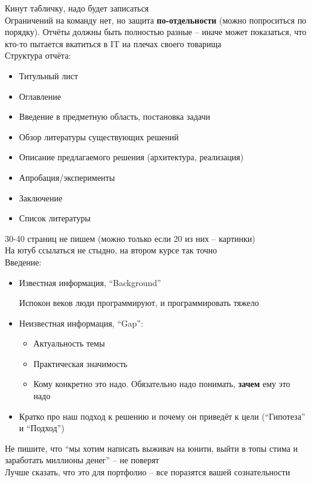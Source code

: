 Кинут табличку, надо будет записаться \\
Ограничений на команду нет, но защита \textbf{по-отдельности} (можно попроситься по порядку). Отчёты должны быть полностью разные -- иначе может показаться, что кто-то пытается вкатиться в IT на плечах своего товарища \\
Структура отчёта:
\begin{itemize}
	\item Титульный лист
	\item Оглавление
	\item Введение в предметную область, постановка задачи
	\item Обзор литературы существующих решений
	\item Описание предлагаемого решения (архитектура, реализация)
	\item Апробация/эксперименты
	\item Заключение
	\item Список литературы
\end{itemize}
30-40 страниц не пишем (можно только если 20 из них -- картинки) \\
На ютуб ссылаться не стыдно, на втором курсе так точно \\
Введение:
\begin{itemize}
	\item Известная информация, ``Background''
	\begin{eg}
		Испокон веков люди программируют, и программировать тяжело
	\end{eg}
	\item Неизвестная информация, ``Gap'':
	\begin{itemize}
		\item Актуальность темы
		\item Практическая значимость
		\item Кому конкретно это надо. Обязательно надо понимать, \textbf{зачем} ему это надо
	\end{itemize}
	\item Кратко про наш подход к решению и почему он приведёт к цели (``Гипотеза'' и ``Подход'')
\end{itemize}

Не пишите, что ``мы хотим написать выживач на юнити, выйти в топы стима и заработать миллионы денег'' -- не поверят \\
Лучше сказать, что это для портфолио -- все поразятся вашей сознательности

